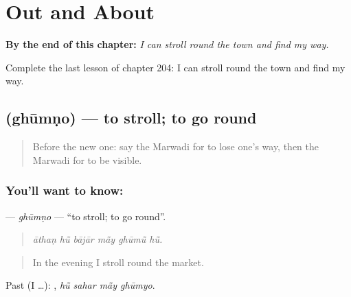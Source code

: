 
\chapter{Out and About}
\label{ch:mw-out-and-about}

\begin{chapteropening}
\textbf{By the end of this chapter:} \emph{I can stroll round the town and find my way.}

Complete the last lesson of chapter 204: I can stroll round the town and find my way.
\end{chapteropening}

\section[\texorpdfstring{\mw{घूमणो} (ghūmṇo)}{घूमणो (ghūmṇo)}]{ (ghūmṇo) — to stroll; to go round}

\label{lesson:MW-C204-ghumno}



\begin{quote}
Before the new one: say the Marwadi for to lose one's way, then the Marwadi for to be visible.
\end{quote}

\subsection*{You'll want to know: }
\textbf{} — \emph{ghūmṇo} — \textquotedblleft{}to stroll; to go round\textquotedblright{}.

\begin{quote}
     
\end{quote}

\begin{quote}
\emph{āthaṇ hū̃ bājār mā̃y ghūmū̃ hū̃.}
\end{quote}

\begin{quote}
In the evening I stroll round the market.
\end{quote}

Past (I …):    , \emph{hū̃ sahar mā̃y ghūmyo}.

